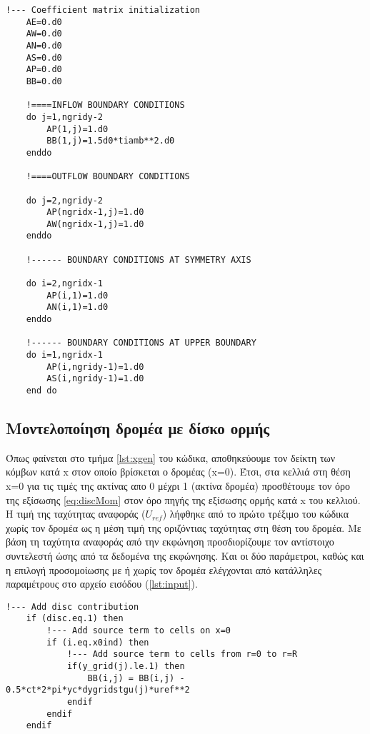 \begin{lstlisting}[caption=\textrm{Οριακές συνθήκες κινητικής ενέργειας τύρβης k}, label={lst:kbc}, mathescape=true, breaklines=true, linewidth=.6\textwidth]
    !--- Coefficient matrix initialization
    AE=0.d0
    AW=0.d0
    AN=0.d0
    AS=0.d0
    AP=0.d0
    BB=0.d0

    !====INFLOW BOUNDARY CONDITIONS                        
    do j=1,ngridy-2
        AP(1,j)=1.d0
        BB(1,j)=1.5d0*tiamb**2.d0
    enddo

    !====OUTFLOW BOUNDARY CONDITIONS                        

    do j=2,ngridy-2
        AP(ngridx-1,j)=1.d0
        AW(ngridx-1,j)=1.d0
    enddo

    !------ BOUNDARY CONDITIONS AT SYMMETRY AXIS   

    do i=2,ngridx-1
        AP(i,1)=1.d0
        AN(i,1)=1.d0
    enddo

    !------ BOUNDARY CONDITIONS AT UPPER BOUNDARY  
    do i=1,ngridx-1
        AP(i,ngridy-1)=1.d0
        AS(i,ngridy-1)=1.d0
    end do  

\end{lstlisting}


\subsection{Μοντελοποίηση δρομέα με δίσκο ορμής}

Όπως φαίνεται στο τμήμα \ref{lst:xgen} του κώδικα, αποθηκεύουμε τον δείκτη των κόμβων κατά x στον οποίο βρίσκεται ο δρομέας (x=0). Έτσι, στα κελλιά στη θέση x=0 για τις τιμές της ακτίνας απο 0 μέχρι 1 (ακτίνα δρομέα) προσθέτουμε τον όρο της εξίσωσης \ref{eq:discMom} στον όρο πηγής της εξίσωσης ορμής κατά x του κελλιού. Η τιμή της ταχύτητας αναφοράς ($U_{ref}$) λήφθηκε από το πρώτο τρέξιμο του κώδικα χωρίς τον δρομέα ως η μέση τιμή της οριζόντιας ταχύτητας στη θέση του δρομέα. Με βάση τη ταχύτητα αναφοράς από την εκφώνηση προσδιορίζουμε τον αντίστοιχο συντελεστή ώσης από τα δεδομένα της εκφώνησης. Και οι δύο παράμετροι, καθώς και η επιλογή προσομοίωσης με ή χωρίς τον δρομέα ελέγχονται από κατάλληλες παραμέτρους στο αρχείο εισόδου (\ref{lst:input}).


\begin{lstlisting}[caption=\textrm{Προσθήκη όρου πηγής - ορμή κατά x - δίσκος ορμής}, label={lst:discTerm}, mathescape=true, breaklines=true, linewidth=.75\textwidth]
    !--- Add disc contribution
    if (disc.eq.1) then
        !--- Add source term to cells on x=0
        if (i.eq.x0ind) then
            !--- Add source term to cells from r=0 to r=R
            if(y_grid(j).le.1) then
                BB(i,j) = BB(i,j) - 0.5*ct*2*pi*yc*dygridstgu(j)*uref**2
            endif
        endif
    endif
\end{lstlisting}